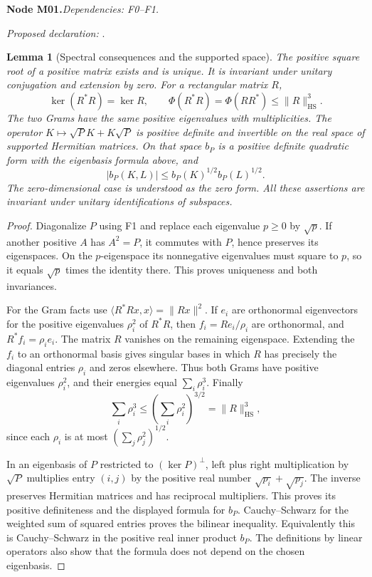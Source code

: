 \documentclass[11pt]{article}
\newtheorem{lemma}[theorem]{Lemma}
\theoremstyle{remark}\newtheorem{remark}[theorem]{Remark}
\newcommand{\HS}{\mathrm{HS}}\newcommand{\Rea}{\operatorname{Re}}
\newcommand{\bpnode}[3]{\par\Needspace{5\baselineskip}\noindent\textbf{Node #1.}\quad\textit{Dependencies: #2.}\par\noindent\textit{Proposed declaration:} \texttt{\detokenize{#3}}.\par\smallskip}
\begin{document}
\bpnode{M01}{F0--F1}{supported_Gram_spectral_facts}
\begin{lemma}[Spectral consequences and the supported space]\label{lem:gram-facts}
The positive square root of a positive matrix exists and is unique. It is invariant under unitary conjugation and extension by zero. For a rectangular matrix $R$,
\[
 \ker(R^*R)=\ker R,\qquad \Phi(R^*R)=\Phi(RR^*)\le\|R\|_{\HS}^3.
\]
The two Grams have the same positive eigenvalues with multiplicities. The operator $K\mapsto\sqrt P K+K\sqrt P$ is positive definite and invertible on the real space of supported Hermitian matrices. On that space $b_P$ is a positive definite quadratic form with the eigenbasis formula above, and
\[
 |b_P(K,L)|\le b_P(K)^{1/2}b_P(L)^{1/2}.
\]
The zero-dimensional case is understood as the zero form. All these assertions are invariant under unitary identifications of subspaces.
\end{lemma}
\begin{proof}
Diagonalize $P$ using F1 and replace each eigenvalue $p\ge0$ by $\sqrt p$. If another positive $A$ has $A^2=P$, it commutes with $P$, hence preserves its eigenspaces. On the $p$-eigenspace its nonnegative eigenvalues must square to $p$, so it equals $\sqrt p$ times the identity there. This proves uniqueness and both invariances.

For the Gram facts use $\langle R^*Rx,x\rangle=\|Rx\|^2$. If $e_i$ are orthonormal eigenvectors for the positive eigenvalues $\rho_i^2$ of $R^*R$, then $f_i=Re_i/\rho_i$ are orthonormal, and $R^*f_i=\rho_i e_i$. The matrix $R$ vanishes on the remaining eigenspace. Extending the $f_i$ to an orthonormal basis gives singular bases in which $R$ has precisely the diagonal entries $\rho_i$ and zeros elsewhere. Thus both Grams have positive eigenvalues $\rho_i^2$, and their energies equal $\sum_i\rho_i^3$. Finally
\[
 \sum_i\rho_i^3\le\left(\sum_i\rho_i^2\right)^{3/2}=\|R\|_{\HS}^3,
\]
since each $\rho_i$ is at most $(\sum_j\rho_j^2)^{1/2}$.

In an eigenbasis of $P$ restricted to $(\ker P)^\perp$, left plus right multiplication by $\sqrt P$ multiplies entry $(i,j)$ by the positive real number $\sqrt{p_i}+\sqrt{p_j}$. The inverse preserves Hermitian matrices and has reciprocal multipliers. This proves its positive definiteness and the displayed formula for $b_P$. Cauchy--Schwarz for the weighted sum of squared entries proves the bilinear inequality. Equivalently this is Cauchy--Schwarz in the positive real inner product $b_P$. The definitions by linear operators also show that the formula does not depend on the chosen eigenbasis.
\end{proof}
\end{document}
